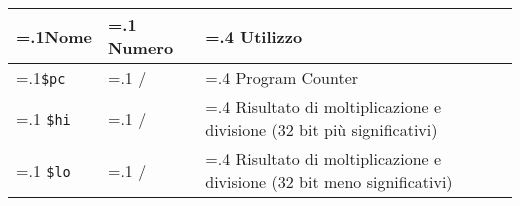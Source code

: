 \documentclass[varwidth=6in]{standalone}
\providecommand\lightrule{%
	\arrayrulecolor{black!30}%
	\midrule[\lightrulewidth]%
	\arrayrulecolor{black}}
\providecommand\register[1]{%
	\texttt{#1}%
}
\begin{document}
\begin{tabularx}{\textwidth}{ >{\hsize=.1\textwidth}X >{\hsize=.1\textwidth}X >{\hsize=.4\textwidth}X X }
	\toprule
		Nome & Numero & Utilizzo \\
	\midrule
		\register{\$pc} & / & Program Counter \\\lightrule
		\register{\$hi} & / & Risultato di moltiplicazione e divisione (\(32\) bit più significativi)\\\lightrule
		\register{\$lo} & / & Risultato di moltiplicazione e divisione (\(32\) bit meno significativi) \\
	\bottomrule
\end{tabularx}
\end{document}
